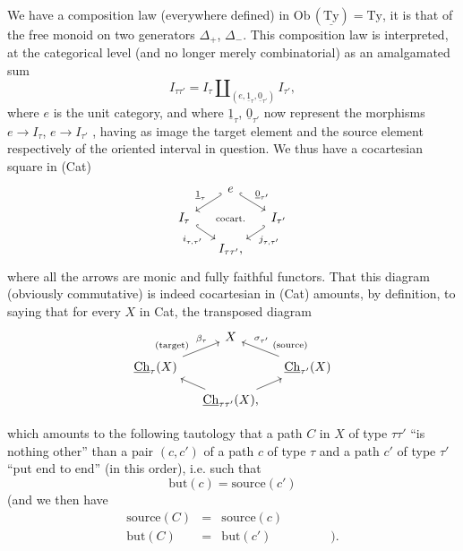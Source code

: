 \documentclass[11pt]{article}
\newcommand{\msp}[1]{\marginpar{\footnotesize [#1]}}
\newcommand{\Ty}{\mathrm{Ty}}
\newcommand{\uTy}{\underline{\mathrm{Ty}}}
\newcommand{\uCh}{\underline{\mathrm{Ch}}}
\begin{document}
We have a composition law (everywhere defined) in $\mathrm{Ob}\,(\uTy) = \Ty$, it is that of the free monoid on two generators $\Delta_+$, $\Delta_-$. This composition law is interpreted, at the categorical level (and no longer merely combinatorial) as an amalgamated sum
\[
I_{\tau\tau'} = I_\tau \amalg_{(e, \underline{1}_\tau, \underline{0}_{\tau'})} I_{\tau'},
\]
where $e$ is the unit category, and where $\underline{1}_\tau$, $\underline{0}_{\tau'}$ now represent the morphisms $e \longrightarrow I_\tau$, $e \longrightarrow I_{\tau'}$ , having as image the target element and the source element respectively of the oriented interval in question. We thus have a cocartesian square in (Cat)
\[
\begin{tikzcd}[column sep=small, row sep=small]
 & e \arrow[dl, hook', "\underline{1}_\tau"'] \arrow[dr, hook, "\underline{0}_{\tau'}"] & \\
I_\tau \arrow[dr, hook, "i_{\tau,\tau'}"'] & \text{\scriptsize cocart.} & I_{\tau'} \arrow[dl, hook', "j_{\tau,\tau'}"] \\
 & I_{\tau\tau'}, &
\end{tikzcd}
\]
where all the arrows are monic and fully faithful functors. That this diagram (obviously commutative) is indeed cocartesian in (Cat) amounts, by definition, to saying that for every $X$ in Cat, the transposed diagram
\[
\begin{tikzcd}[column sep=small, row sep=small]
 & X & \\
\uCh_\tau(X) \arrow[ur, "\beta_\tau" near end, "\text{\scriptsize (target)}" near start] & & \uCh_{\tau'}(X) \arrow[ul, "\sigma_{\tau'}"' near end, "\text{\scriptsize (source)}"' near start] \\
 & \uCh_{\tau\tau'}(X), \arrow[ul] \arrow[ur] &
\end{tikzcd}
\]



\msp{page 49}which amounts to the following tautology that a path $C$ in $X$ of type $\tau\tau'$ ``is nothing other'' than a pair $(c,c')$ of a path $c$ of type $\tau$ and a path $c'$ of type $\tau'$ ``put end to end'' (in this order), i.e. such that
\[
\mathrm{but}(c) = \mathrm{source}(c')
\]
(and we then have
\[
\begin{array}{rcll}
\mathrm{source}(C) & = & \mathrm{source}(c) & \\[1ex]
\mathrm{but}(C) & = & \mathrm{but}(c') & \qquad\quad ).
\end{array}
\]
\end{document}
